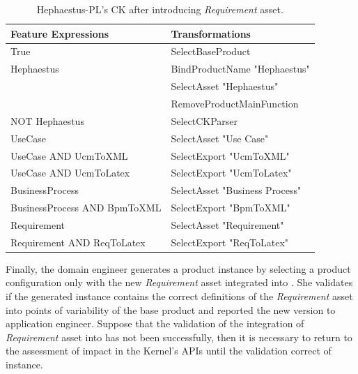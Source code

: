 \begin{table}[h]
\begin{center}
\begin{tabular}{||l||l||}
  \hline
  \textbf{Feature Expressions} & \textbf{Transformations}   \\  \hline
  True                         & SelectBaseProduct \\  \hline
  Hephaestus                   & BindProductName "Hephaestus" \\ 
                               & SelectAsset "Hephaestus"   \\
                               & RemoveProductMainFunction \\ \hline
  NOT Hephaestus               & SelectCKParser \\ \hline  
  UseCase                      & SelectAsset "Use Case" \\ \hline
  UseCase AND UcmToXML         & SelectExport "UcmToXML"  \\ \hline
  UseCase AND UcmToLatex       & SelectExport "UcmToLatex" \\ \hline
  BusinessProcess              & SelectAsset "Business Process" \\ \hline
  BusinessProcess AND BpmToXML & SelectExport "BpmToXML" \\ \hline
  Requirement                  & SelectAsset "Requirement" \\ \hline
  Requirement AND ReqToLatex   & SelectExport "ReqToLatex" \\ \hline
\end{tabular}
\caption{Hephaestus-PL's CK after introducing \textit{Requirement} asset.}
\label{tab:ck-hpl-ucm-bpm-req}
\end{center}
\end{table}


Finally, the domain engineer generates a product \hpl{} instance by selecting a product configuration only with the new \textit{Requirement} asset integrated into \hpl{}. She validates if the generated instance contains the correct definitions of the \textit{Requirement} asset into points of variability of the \hpl{} base product and reported the new \hpl{} version to application engineer. Suppose that the validation of the integration of \textit{Requirement} asset into \hpl{} has not been successfully, then it is necessary to return to the assessment of impact in the \hpl{} Kernel's APIs until the validation correct of \hpl{} instance.
 

